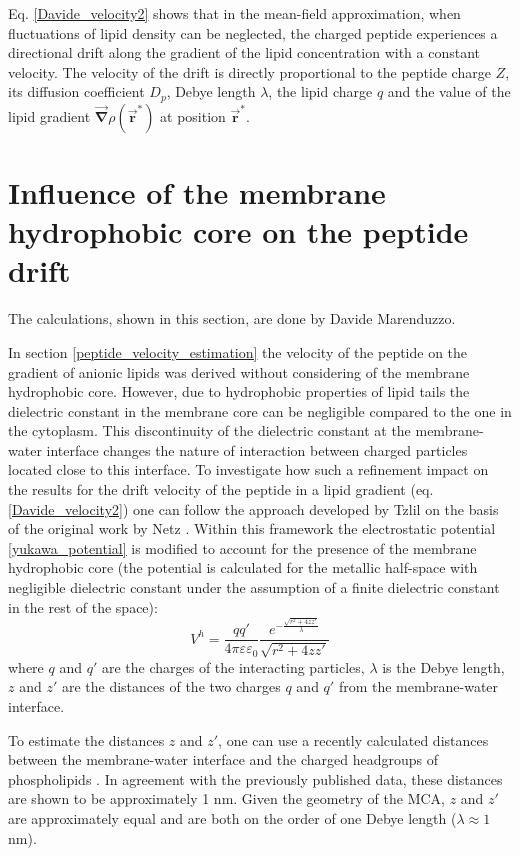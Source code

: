 Eq. \eqref{Davide_velocity2} shows that in the mean-field approximation, when fluctuations of lipid density can be neglected, the charged peptide experiences a directional drift along the gradient of the lipid concentration with a constant velocity. The velocity of the drift is directly proportional to the peptide charge $Z$, its diffusion coefficient $D_p$, Debye length $\lambda$, the lipid charge $q$ and the value of the lipid gradient $\vec{\mathbf{\nabla}}\rho(\vec{\mathbf{r}}^*)$ at position $\vec{\mathbf{r}}^*$.

\section{Influence of the membrane hydrophobic core on the peptide drift}

The calculations, shown in this section, are done by Davide Marenduzzo.

In section \ref{peptide_velocity_estimation} the velocity of the peptide on the gradient of anionic lipids was derived without considering of the membrane hydrophobic core. However, due to hydrophobic properties of lipid tails the dielectric constant in the membrane core can be negligible compared to the one in the cytoplasm. This discontinuity of the dielectric constant at the membrane-water interface changes the nature of interaction between charged particles located close to this interface. To investigate how such a refinement impact on the results for the drift velocity of the peptide in a lipid gradient (eq. \eqref{Davide_velocity2}) one can follow the approach developed by Tzlil \cite{Tzlil2008} on the basis of the original work by Netz \cite{Netz1999}. Within this framework the electrostatic potential \eqref{yukawa_potential} is modified to account for the presence of the membrane hydrophobic core (the potential is calculated for the metallic half-space with negligible dielectric constant under the assumption of a finite dielectric constant in the rest of the space):
\begin{equation}
 V^h=\frac{qq'}{4\pi\varepsilon\varepsilon_0}\frac{e^{-\frac{\sqrt{r^2+4zz'}}{\lambda}}}{\sqrt{r^2+4zz'}}
\end{equation}
where $q$ and $q'$ are the charges of the interacting particles, $\lambda$ is the Debye length, $z$ and $z'$ are the distances of the
two charges $q$ and $q'$ from the membrane-water interface.

To estimate the distances $z$ and $z'$, one can use a recently calculated distances between the membrane-water interface and the charged headgroups of phospholipids \cite{Nymeyer2008}. In agreement with the previously published data, these distances are shown to be approximately 1 nm. Given the geometry of the MCA, $z$ and $z'$ are approximately equal and are both on the order of one Debye length ($\lambda\approx1$ nm).

